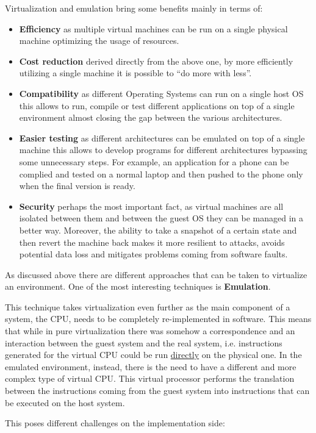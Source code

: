 Virtualization and emulation bring some benefits mainly in terms of:
\begin{itemize}
    \item \textbf{Efficiency} as multiple virtual machines can be run on a single physical machine optimizing the usage of resources.
    \item \textbf{Cost reduction} derived directly from the above one, by more efficiently utilizing a single machine it is possible to ``do more with less''.
    \item \textbf{Compatibility} as different Operating Systems can run on a single host OS this allows to run, compile or test different applications on top of a single environment almost closing the gap between the various architectures.
    \item \textbf{Easier testing} as different architectures can be emulated on top of a single machine this allows to develop programs for different architectures bypassing some unnecessary steps. For example, an application for a phone can be complied and tested on a normal laptop and then pushed to the phone only when the final version is ready.
    \item \textbf{Security} perhaps the most important fact, as virtual machines are all isolated between them and between the guest OS they can be managed in a better way. Moreover, the ability to take a snapshot of a certain state and then revert the machine back makes it more resilient to attacks, avoids potential data loss and mitigates problems coming from software faults. 
\end{itemize}

As discussed above there are different approaches that can be taken to virtualize an environment. One of the most interesting techniques is \textbf{Emulation}. 

This technique takes virtualization even further as the main component of a system, the CPU, needs to be completely re-implemented in software. This means that while in pure virtualization there was somehow a correspondence and an interaction between the guest system and the real system, i.e. instructions generated for the virtual CPU could be run \underline{directly} on the physical one. In the emulated environment, instead, there is the need to have a different and more complex type of virtual CPU. This virtual processor performs the translation between the instructions coming from the guest system into instructions that can be executed on the host system.

This poses different challenges on the implementation side: 

